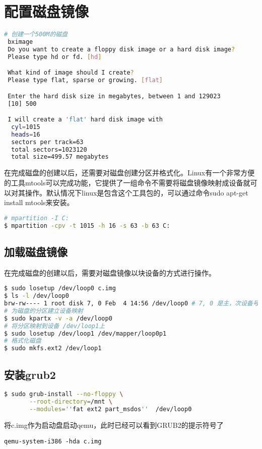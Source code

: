 \documentclass[b5paper,9pt,twoside,openany]{article}
\begin{document}
\section{配置磁盘镜像}
\begin{lstlisting}[language=bash]
# 创建一个500M的磁盘
 bximage
 Do you want to create a floppy disk image or a hard disk image?
 Please type hd or fd. [hd] 

 What kind of image should I create?
 Please type flat, sparse or growing. [flat]

 Enter the hard disk size in megabytes, between 1 and 129023
 [10] 500

 I will create a 'flat' hard disk image with
  cyl=1015
  heads=16
  sectors per track=63
  total sectors=1023120
  total size=499.57 megabytes
\end{lstlisting}

在完成磁盘的创建以后，还需要对磁盘创建分区并格式化。Linux有一个非常方便的工具mtools可以完成功能，它提供了一组命令不需要将磁盘镜像映射成设备就可以对其操作。默认情况下linux是包含这个工具包的，可以通过命令sudo apt-get install mtools来安装。
\begin{lstlisting}[language=bash]
# mpartition -I C:
$ mpartition -cpv -t 1015 -h 16 -s 63 -b 63 C:
\end{lstlisting}

\subsection{加载磁盘镜像}
在完成磁盘的创建以后，需要对磁盘镜像以块设备的方式进行操作。
\begin{lstlisting}[language=bash]
$ sudo losetup /dev/loop0 c.img
$ ls -l /dev/loop0
brw-rw---- 1 root disk 7, 0 Feb  4 14:56 /dev/loop0 # 7, 0 是主，次设备号
# 为磁盘的分区建立设备映射
$ sudo kpartx -v -a /dev/loop0
# 将分区映射到设备 /dev/loop1上
$ sudo losetup /dev/loop1 /dev/mapper/loop0p1
# 格式化磁盘
$ sudo mkfs.ext2 /dev/loop1
\end{lstlisting}

\subsection{安装grub2}

\begin{lstlisting}[language=bash]
$ sudo grub-install --no-floppy \
       --root-directory=/mnt \
       --modules=''fat ext2 part_msdos''  /dev/loop0
\end{lstlisting}
将c.img作为启动盘启动qemu，此时已经可以看到GRUB2的提示符号了
\begin{lstlisting}
qemu-system-i386 -hda c.img
\end{lstlisting}
\end{document}
